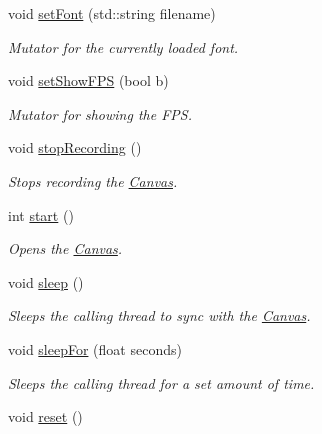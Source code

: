 \begin{DoxyCompactItemize}
void \hyperlink{classtsgl_1_1_canvas_a692edf8e37c7714cdf2a58ea530c63e9}{set\+Font} (std\+::string filename)
\begin{DoxyCompactList}\small\item\em Mutator for the currently loaded font. \end{DoxyCompactList}\item 
void \hyperlink{classtsgl_1_1_canvas_a8722c579dfa55a45e139bfeb269d73ff}{set\+Show\+F\+P\+S} (bool b)
\begin{DoxyCompactList}\small\item\em Mutator for showing the F\+P\+S. \end{DoxyCompactList}\item 
void \hyperlink{classtsgl_1_1_canvas_ac6035d87aa3bf077031bc0bb6f419b17}{stop\+Recording} ()
\begin{DoxyCompactList}\small\item\em Stops recording the \hyperlink{classtsgl_1_1_canvas}{Canvas}. \end{DoxyCompactList}\item 
int \hyperlink{classtsgl_1_1_canvas_a654315f9b08a9b3b072eebf4b4d8ae89}{start} ()
\begin{DoxyCompactList}\small\item\em Opens the \hyperlink{classtsgl_1_1_canvas}{Canvas}. \end{DoxyCompactList}\item 
void \hyperlink{classtsgl_1_1_canvas_a2604fa056d4541f918ccf447eda1f3cf}{sleep} ()
\begin{DoxyCompactList}\small\item\em Sleeps the calling thread to sync with the \hyperlink{classtsgl_1_1_canvas}{Canvas}. \end{DoxyCompactList}\item 
void \hyperlink{classtsgl_1_1_canvas_a6674cc86b9a54b6a564021fddce47e36}{sleep\+For} (float seconds)
\begin{DoxyCompactList}\small\item\em Sleeps the calling thread for a set amount of time. \end{DoxyCompactList}\item 
\hypertarget{classtsgl_1_1_canvas_ada6403439b583910d27e497148da5f2e}{}void \hyperlink{classtsgl_1_1_canvas_ada6403439b583910d27e497148da5f2e}{reset} ()\label{classtsgl_1_1_canvas_ada6403439b583910d27e497148da5f2e}


\end{DoxyCompactItemize}
